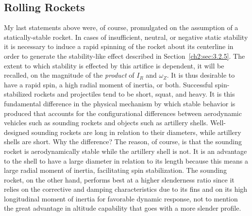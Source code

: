 \subsection{Rolling Rockets}\label{ch2:sec:6.3}

My last statements above were, of course, promulgated on the assumption of a
statically-stable rocket. In cases of insufficient, neutral, or negative
static stability it is necessary to induce a rapid spinning of the rocket
about its centerline in order to generate the stability-like effect described
in Section~\ref{ch2:sec:3.2.5}. The extent to which stability is effected by
this artifice is dependent, it will be recalled, on the magnitude of the
\emph{product} of $I_R$ and $\omega_Z$. It is thus desirable to have a rapid
spin, a high radial moment of inertia, or both. Successful spin-stabilized
rockets and projectiles tend to be short, squat, and heavy. It is this
fundamental difference in the physical mechanism by which stable behavior is
produced that accounts for the configurational differences between
aerodynamic vehicles such as sounding rockets and objects such as artillery
shells. Well-designed sounding rockets are long in relation to their
diameters, while artillery shells are short. Why the difference? The reason,
of course, is that the sounding rocket is aerodynamically stable while the
artillery shell is not. It is an advantage to the shell to have a large
diameter in relation to its length because this means a large radial moment
of inertia, facilitating spin stabilization. The sounding rocket, on the
other hand, performs best at a higher slenderness ratio since it relies on
the corrective and damping characteristics due to its fins and on its high
longitudinal moment of inertia for favorable dynamic response, not to mention
the great advantage in altitude capability that goes with a more slender
profile.

